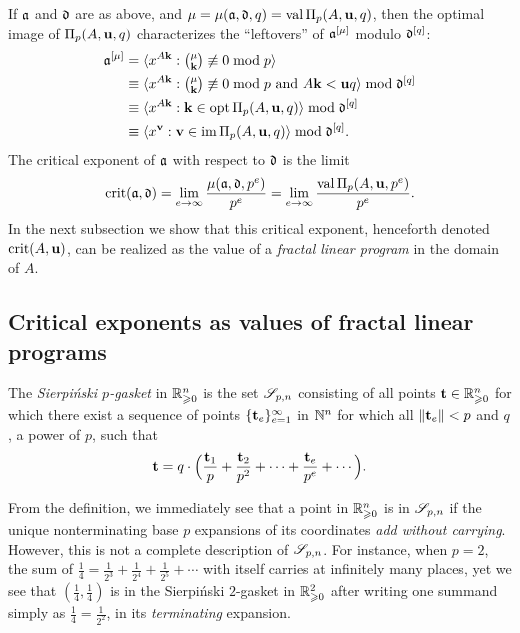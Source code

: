 \documentclass[11pt]{amsart}
\begin{document}
If $\mathfrak{a}$ and $\mathfrak{d}$ are as above, and $\mu = \mu(\mathfrak{a},\mathfrak{d},q) = \operatorname{val} \Pi_p(A,\mathbf{u},q)$, then the optimal image of $\Pi_p(A,\mathbf{u},q)$ characterizes the ``leftovers'' of $\mathfrak{a}^{[\mu]}$ modulo $\mathfrak{d}^{[q]}$:
\begin{align*}
  \mathfrak{a}^{[\mu]} &= \langle x^{A\mathbf{k}}: \textstyle\binom{\mu}{\mathbf{k}} \not\equiv 0 \bmod{p} \rangle\\
  &\equiv \langle x^{A\mathbf{k}}: \textstyle\binom{\mu}{\mathbf{k}} \not\equiv 0 \bmod{p}\text{ and } A\mathbf{k} <\mathbf{u}q \rangle \bmod \mathfrak{d}^{[q]}\\
  &\equiv \langle x^{A\mathbf{k}}: \mathbf{k}\in \operatorname{opt}\Pi_p(A,\mathbf{u},q) \rangle \bmod \mathfrak{d}^{[q]}\\
  &\equiv \langle x^{\mathbf{v}}: \mathbf{v} \in \operatorname{im} \Pi_p(A,\mathbf{u},q) \rangle \bmod \mathfrak{d}^{[q]}.
\end{align*}
The critical exponent of $\mathfrak{a}$ with respect to $\mathfrak{d}$ is the limit
\begin{equation*}
\operatorname{crit}(\mathfrak{a},\mathfrak{d}) = \lim_{e\to\infty} \frac{\mu(\mathfrak{a},\mathfrak{d},p^e)}{p^e} = \lim_{e\to\infty} \frac{\operatorname{val} \Pi_p(A,\mathbf{u},p^e)}{p^e}.
\end{equation*}
In the next subsection we show that this critical exponent, henceforth denoted $\operatorname{crit}(A,\mathbf{u})$, can be realized as the value of a \emph{fractal linear program} in the domain of $A$.

\subsection{Critical exponents as values of fractal linear programs}

\begin{definition}
   The \emph{Sierpi\'nski $p$-gasket} in $\mathbb{R}_{\geqslant 0}^n$ is the set $\mathscr{S}_{p,n}$ consisting of all points $\mathbf{t}\in \mathbb{R}_{\geqslant 0}^n$ for which there exist a sequence of points $\{ \mathbf{t}_e \}_{e=1}^\infty$ in $\mathbb{N}^n$ for which all $\| \mathbf{t}_e \| < p$ and $q$, a power of $p$, such that
 \[
\mathbf{t} = q\cdot\Big(\frac{\mathbf{t}_1}{p} +\frac{\mathbf{t}_2}{p^2}+\cdots +\frac{\mathbf{t}_e}{p^e} + \cdots \Big).  
 \]
\end{definition}

From the definition, we immediately see that a point in $\mathbb{R}_{\geqslant 0}^n$ is in $\mathscr{S}_{p,n}$ if the unique nonterminating base $p$ expansions of its coordinates \emph{add without carrying}.
However, this is not a complete description of $\mathscr{S}_{p,n}$.
For instance, when $p=2$, the sum of $\frac{1}{4} = \frac{1}{2^3} + \frac{1}{2^4} + \frac{1}{2^5} + \cdots$ with itself carries at infinitely many places, yet we see that $\left(\frac{1}{4}, \frac{1}{4}\right)$ is in the Sierpi\'nski $2$-gasket in $\mathbb{R}_{\geqslant 0}^2$ after writing one summand simply as $\frac{1}{4} = \frac{1}{2^2}$, \ie in its \emph{terminating} expansion.
\end{document}
